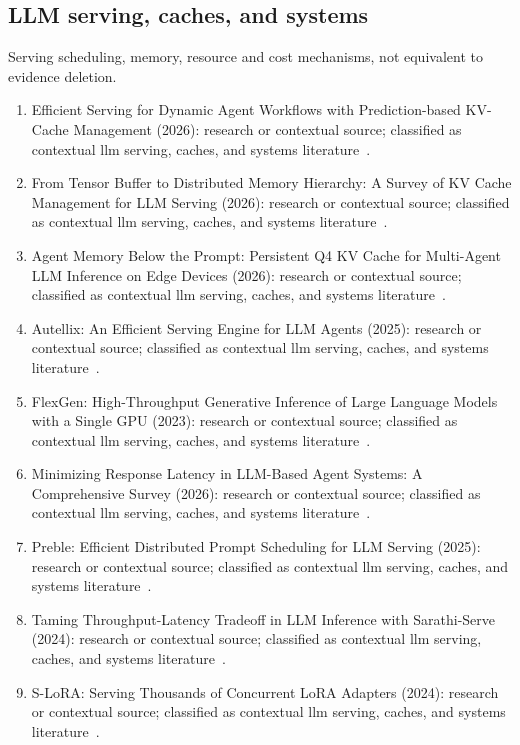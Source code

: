 \normalsize

\subsection{LLM serving, caches, and systems}
Serving scheduling, memory, resource and cost mechanisms, not equivalent to evidence deletion.
\begin{enumerate}
\setlength{\itemsep}{1pt}\setlength{\parskip}{0pt}
\footnotesize
\item Efficient Serving for Dynamic Agent Workflows with Prediction-based {KV}-Cache Management (2026): research or contextual source; classified as contextual llm serving, caches, and systems literature~\cite{ext025}.
\item From Tensor Buffer to Distributed Memory Hierarchy: A Survey of {KV} Cache Management for {LLM} Serving (2026): research or contextual source; classified as contextual llm serving, caches, and systems literature~\cite{ext026}.
\item Agent Memory Below the Prompt: Persistent {Q4} {KV} Cache for Multi-Agent {LLM} Inference on Edge Devices (2026): research or contextual source; classified as contextual llm serving, caches, and systems literature~\cite{ext027}.
\item {Autellix}: An Efficient Serving Engine for {LLM} Agents (2025): research or contextual source; classified as contextual llm serving, caches, and systems literature~\cite{ext028}.
\item {FlexGen}: High-Throughput Generative Inference of Large Language Models with a Single {GPU} (2023): research or contextual source; classified as contextual llm serving, caches, and systems literature~\cite{ext040}.
\item Minimizing Response Latency in {LLM}-Based Agent Systems: A Comprehensive Survey (2026): research or contextual source; classified as contextual llm serving, caches, and systems literature~\cite{ext042}.
\item Preble: Efficient Distributed Prompt Scheduling for {LLM} Serving (2025): research or contextual source; classified as contextual llm serving, caches, and systems literature~\cite{ext049}.
\item Taming Throughput-Latency Tradeoff in {LLM} Inference with {Sarathi-Serve} (2024): research or contextual source; classified as contextual llm serving, caches, and systems literature~\cite{ext050}.
\item {S-LoRA}: Serving Thousands of Concurrent {LoRA} Adapters (2024): research or contextual source; classified as contextual llm serving, caches, and systems literature~\cite{ext051}.

\end{enumerate}
